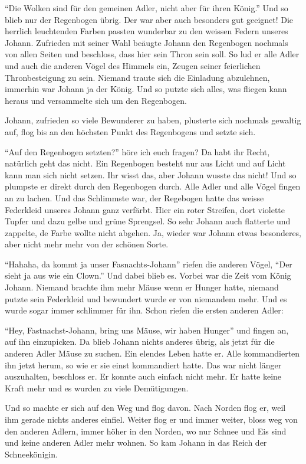 \enquote{Die Wolken sind für den gemeinen Adler, nicht aber für ihren König.} Und so blieb nur der Regenbogen übrig. Der war aber auch besonders gut geeignet! Die herrlich leuchtenden Farben passten wunderbar zu den weissen Federn unseres Johann. Zufrieden mit seiner Wahl beäugte Johann den Regenbogen nochmals von allen Seiten und beschloss, dass hier sein Thron sein soll. So lud er alle Adler und auch die anderen Vögel des Himmels ein, Zeugen seiner feierlichen Thronbesteigung zu sein. Niemand traute sich die Einladung abzulehnen, immerhin war Johann ja der König. Und so putzte sich alles, was fliegen kann heraus und versammelte sich um den Regenbogen.

Johann, zufrieden so viele Bewunderer zu haben, plusterte sich nochmals gewaltig auf, flog bis an den höchsten Punkt des Regenbogens und setzte sich.

\enquote{Auf den Regenbogen setzten?} höre ich euch fragen? Da habt ihr Recht, natürlich geht das nicht. Ein Regenbogen besteht nur aus Licht und auf Licht kann man sich nicht setzen. Ihr wisst das, aber Johann wusste das nicht! Und so plumpste er direkt durch den Regenbogen durch. Alle Adler und alle Vögel fingen an zu lachen. Und das Schlimmste war, der Regebogen hatte das weisse Federkleid unseres Johann ganz verfärbt. Hier ein roter Streifen, dort violette Tupfer und dazu gelbe und grüne Sprengsel. So sehr Johann auch flatterte und zappelte, de Farbe wollte nicht abgehen. Ja, wieder war Johann etwas besonderes, aber nicht mehr mehr von der schönen Sorte.

\enquote{Hahaha, da kommt ja unser Fasnachts-Johann} riefen die anderen Vögel, \enquote{Der sieht ja aus wie ein Clown.} Und dabei blieb es. Vorbei war die Zeit vom König Johann. Niemand brachte ihm mehr Mäuse wenn er Hunger hatte, niemand putzte sein Federkleid und bewundert wurde er von niemandem mehr. Und es wurde sogar immer schlimmer für ihn. Schon riefen die ersten anderen Adler:

\enquote{Hey, Fastnachst-Johann, bring uns Mäuse, wir haben Hunger} und fingen an, auf ihn einzupicken. Da blieb Johann nichts anderes übrig, als jetzt für die anderen Adler Mäuse zu suchen. Ein elendes Leben hatte er. Alle kommandierten ihn jetzt herum, so wie er sie einst kommandiert hatte. Das war nicht länger auszuhalten, beschloss er. Er konnte auch einfach nicht mehr. Er hatte keine Kraft mehr und es wurden zu viele Demütigungen.

Und so machte er sich auf den Weg und flog davon. Nach Norden flog er, weil ihm gerade nichts anderes einfiel. Weiter flog er und immer weiter, bloss weg von den anderen Adlern, immer höher in den Norden, wo nur Schnee und Eis sind und keine anderen Adler mehr wohnen. So kam Johann in das Reich der Schneekönigin.

